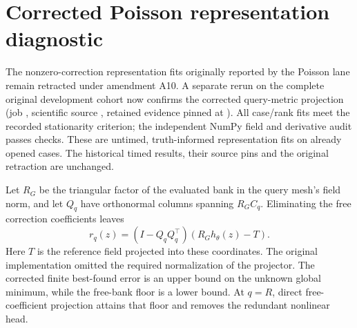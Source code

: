 \clearpage
\section{Corrected Poisson representation diagnostic}
\label{app:oracle-confirmation}

The nonzero-correction representation fits originally reported by the
Poisson lane remain retracted under amendment A10. A separate rerun on
the complete original development cohort now confirms the corrected
query-metric projection (job \provOracleConfirmationJob, scientific source
\texttt{\provOracleConfirmationSource}, retained evidence pinned at
\texttt{\provOracleConfirmationPin}). All
\nOracleConfirmationFits{} case/rank fits meet the recorded stationarity
criterion; the independent NumPy field and derivative audit passes
\nOracleConfirmationChecks{} checks. These are untimed, truth-informed
representation fits on already opened cases. The historical timed
results, their source pins and the original retraction are unchanged.

Let $R_G$ be the triangular factor of the evaluated bank in the query
mesh's field norm, and let $Q_q$ have orthonormal columns spanning
$R_G C_q$. Eliminating the free correction coefficients leaves
\begin{equation}
 r_q(z)=(I-Q_qQ_q^\top)(R_Gh_\theta(z)-T).
\end{equation}
Here $T$ is the reference field projected into these coordinates.
The original implementation omitted the required normalization of the
projector. The corrected finite best-found error is an upper bound on
the unknown global minimum, while the free-bank floor is a lower bound.
At $q=R$, direct free-coefficient projection attains that floor and
removes the redundant nonlinear head.

\begin{table}[h]
\centering
\small
\setlength{\tabcolsep}{3pt}
\caption{Separately confirmed Poisson representation errors (\%) on the
original development sources. Original starts use the unchanged
nearest-training-code multistart prescription with the repaired projector.
Best found additionally permits previously retained solved states and the
preceding rank's best fit as feasible starts. Median summarizes the
safeguarded errors. Original starts and best found report worst-case
errors; bank floor is the worst free-bank projection error.
Stationary counts cases satisfying the normalized-gradient rule, with
the direct endpoint stationary by construction. None is a new inference
timing or sealed-test result.}
\label{tab:oracle-confirmation}
\resizebox{\linewidth}{!}{}
\end{table}

